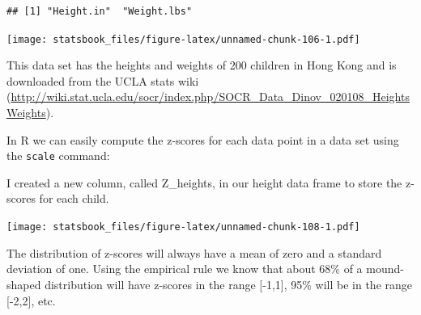 \documentclass[
]{book}
\newenvironment{Shaded}{\begin{snugshade}}{\end{snugshade}}
\newcommand{\AttributeTok}[1]{\textcolor[rgb]{0.77,0.63,0.00}{#1}}
\newcommand{\DecValTok}[1]{\textcolor[rgb]{0.00,0.00,0.81}{#1}}
\newcommand{\FunctionTok}[1]{\textcolor[rgb]{0.00,0.00,0.00}{#1}}
\newcommand{\NormalTok}[1]{#1}
\newcommand{\OtherTok}[1]{\textcolor[rgb]{0.56,0.35,0.01}{#1}}
\newcommand{\SpecialCharTok}[1]{\textcolor[rgb]{0.00,0.00,0.00}{#1}}
\newcommand{\StringTok}[1]{\textcolor[rgb]{0.31,0.60,0.02}{#1}}
\theoremstyle{definition}
\theoremstyle{definition}
\theoremstyle{definition}
\theoremstyle{definition}
\theoremstyle{remark}
\begin{document}
\begin{verbatim}
## [1] "Height.in"  "Weight.lbs"
\end{verbatim}

\begin{Shaded}
\end{Shaded}

\texttt{[image: statsbook\_files/figure-latex/unnamed-chunk-106-1.pdf]}

This data set has the heights and weights of 200 children in Hong Kong and is downloaded from the UCLA stats wiki (\url{http://wiki.stat.ucla.edu/socr/index.php/SOCR_Data_Dinov_020108_HeightsWeights}).

In R we can easily compute the z-scores for each data point in a data set using the \texttt{scale} command:

\begin{Shaded}
\end{Shaded}

I created a new column, called Z\_heights, in our height data frame to store the z-scores for each child.

\begin{Shaded}
\end{Shaded}

\texttt{[image: statsbook\_files/figure-latex/unnamed-chunk-108-1.pdf]}

The distribution of z-scores will always have a mean of zero and a standard deviation of one. Using the empirical rule we know that about 68\% of a mound-shaped distribution will have z-scores in the range {[}-1,1{]}, 95\% will be in the range {[}-2,2{]}, etc.
\end{document}
